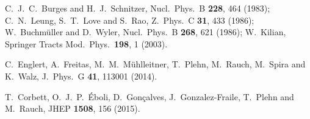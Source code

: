   C.~J.~C.~Burges and H.~J.~Schnitzer,
  Nucl.\ Phys.\ B {\bf 228}, 464 (1983); 
  C.~N.~Leung, S.~T.~Love and S.~Rao,
  Z.\ Phys.\ C {\bf 31}, 433 (1986); 
  W.~Buchm\"uller and D.~Wyler,
  Nucl.\ Phys.\ B {\bf 268}, 621 (1986);
  W.~Kilian,
  Springer Tracts Mod.\ Phys.\  {\bf 198}, 1 (2003).
  
  C.~Englert, A.~Freitas, M.~M.~M\"uhlleitner, T.~Plehn, M.~Rauch, M.~Spira and K.~Walz,
  J.\ Phys.\ G {\bf 41}, 113001 (2014).

  T.~Corbett, O.~J.~P.~\'Eboli, D.~Gon\c{c}alves, J.~Gonzalez-Fraile, T.~Plehn and M.~Rauch,
  JHEP {\bf 1508}, 156 (2015).
  
